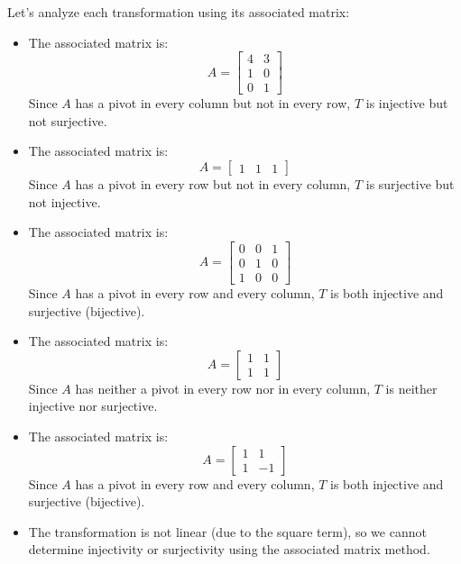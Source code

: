 \begin{exercise}
\begin{itemize}[itemsep=1pt,label=$\circ$]
    \end{itemize}
    \Answer
    Let's analyze each transformation using its associated matrix:
    \begin{itemize}[itemsep=1pt,label=$\circ$]
        \item The associated matrix is:
        \[
            A = \begin{bmatrix} 4 & 3 \\ 1 & 0 \\ 0 & 1 \end{bmatrix}
        \]
        Since $A$ has a pivot in every column but not in every row, $T$ is injective but not surjective.
        \item The associated matrix is:
        \[
            A = \begin{bmatrix} 1 & 1 & 1 \end{bmatrix}
        \]
        Since $A$ has a pivot in every row but not in every column, $T$ is surjective but not injective.
        \item The associated matrix is:
        \[
            A = \begin{bmatrix} 0 & 0 & 1 \\ 0 & 1 & 0 \\ 1 & 0 & 0 \end{bmatrix}
        \]
        Since $A$ has a pivot in every row and every column, $T$ is both injective and surjective (bijective).
        \item The associated matrix is:
        \[
            A = \begin{bmatrix} 1 & 1 \\ 1 & 1 \end{bmatrix}
        \]
        Since $A$ has neither a pivot in every row nor in every column, $T$ is neither injective nor surjective.
        \item The associated matrix is:
        \[
            A = \begin{bmatrix} 1 & 1 \\ 1 & -1 \end{bmatrix}
        \]
        Since $A$ has a pivot in every row and every column, $T$ is both injective and surjective (bijective).
        \item The transformation is not linear (due to the square term), so we cannot determine injectivity or surjectivity using the associated matrix method.
    \end{itemize}
\end{exercise}